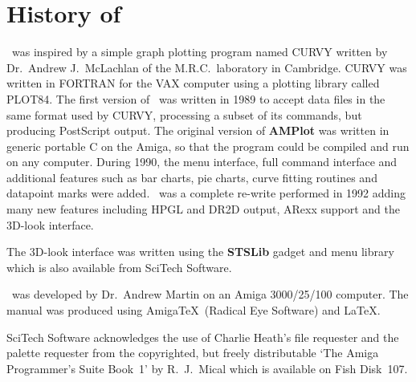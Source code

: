 
\chapter{History of \amplot}
\amplot\ was inspired by a simple graph plotting program named CURVY written by 
Dr.\ Andrew J.\ McLachlan of the M.R.C.\ laboratory in Cambridge. CURVY was 
written in FORTRAN for the VAX computer using a plotting library called PLOT84.
The first version of \amplot\ was written in 1989 to accept data files in the 
same format used by CURVY, processing a subset of its commands, but producing 
PostScript output. The original version of {\bf AMPlot} was written in generic
portable C on the Amiga, so that the program could be compiled and run on any 
computer. During 1990, the menu interface, full command interface and additional 
features such as bar charts, pie charts, curve fitting routines and datapoint marks 
were added. \amplot\ was a complete re-write performed in 1992 adding many new 
features including HPGL and DR2D output, ARexx support and the 3D-look interface.

The 3D-look interface was written using the {\bf STSLib} gadget and menu library 
which is also available from {\sf SciTech Software}.

\amplot\ was developed by Dr.\ Andrew Martin on an Amiga 3000/25/100 computer.
The manual was produced using Amiga\TeX\ (Radical Eye Software) and \LaTeX.

{\sf SciTech Software} acknowledges the use of Charlie Heath's file requester and
the palette requester from the copyrighted, but freely distributable
`The Amiga Programmer's Suite Book~1' by R.\ J.\ Mical which is available on Fish 
Disk~107.

